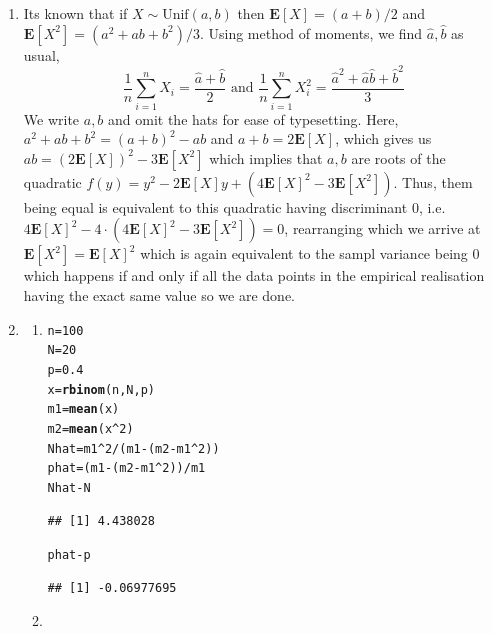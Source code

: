 \documentclass[12pt,a4paper]{article}\usepackage[]{graphicx}\usepackage[]{xcolor}
\makeatletter
\newcommand{\hlnum}[1]{\textcolor[rgb]{0.686,0.059,0.569}{#1}}%
\newcommand{\hlopt}[1]{\textcolor[rgb]{0,0,0}{#1}}%
\newcommand{\hldef}[1]{\textcolor[rgb]{0.345,0.345,0.345}{#1}}%
\newcommand{\hlkwb}[1]{\textcolor[rgb]{0.69,0.353,0.396}{#1}}%
\newcommand{\hlkwd}[1]{\textcolor[rgb]{0.737,0.353,0.396}{\textbf{#1}}}%
\newenvironment{kframe}{%
 \def\at@end@of@kframe{}%
 \ifinner\ifhmode%
  \def\at@end@of@kframe{\end{minipage}}%
  \begin{minipage}{\columnwidth}%
 \fi\fi%
 \def\FrameCommand##1{\hskip\@totalleftmargin \hskip-\fboxsep
 \colorbox{shadecolor}{##1}\hskip-\fboxsep
     \hskip-\linewidth \hskip-\@totalleftmargin \hskip\columnwidth}%
 \MakeFramed {\advance\hsize-\width
   \@totalleftmargin\z@ \linewidth\hsize
   \@setminipage}}%
 {\par\unskip\endMakeFramed%
 \at@end@of@kframe}
\newenvironment{knitrout}{}{} %
\makeatother
\begin{document}
\begin{enumerate}[label=\arabic*.]
	\item 
	Its known that if $X\sim\text{Unif}(a,b)$ then $\mathbf{E}[X]=(a+b)/2$
	and $\mathbf{E}[X^2]=(a^2+ab+b^2)/3$. Using method of moments, we find
	$\hat{a},\hat{b}$ as usual,
	$$\frac{1}{n}\sum_{i=1}^nX_i=\frac{\hat{a}+\hat{b}}{2}\text{ and
	}\frac{1}{n}\sum_{i=1}^nX_i^2=\frac{\hat{a}^2+\hat{a}\hat{b}+\hat{b}^2}{3}$$
	We write $a,b$ and omit the hats for ease of typesetting. Here,
	$a^2+ab+b^2=(a+b)^2-ab$ and $a+b=2\mathbf{E}[X]$, which gives us
	$ab=(2\mathbf{E}[X])^2-3\mathbf{E}[X^2]$ which implies that $a,b$ are
	roots of the quadratic
	$f(y)=y^2-2\mathbf{E}[X]y+(4\mathbf{E}[X]^2-3\mathbf{E}[X^2])$. Thus,
	them being equal is equivalent to this quadratic having discriminant
	$0$, i.e.
	$4\mathbf{E}[X]^2-4\cdot(4\mathbf{E}[X]^2-3\mathbf{E}[X^2])=0$,
	rearranging which we arrive at $\mathbf{E}[X^2]=\mathbf{E}[X]^2$ which
	is again equivalent to the sampl variance being $0$ which happens if
	and only if all the data points in the empirical realisation having the
	exact same value so we are done.
	\item 
	\begin{enumerate}[label=(\alph*)]
        \item 
\begin{knitrout}
\color{fgcolor}\begin{kframe}
\begin{alltt}
\hldef{n} \hlkwb{=} \hlnum{100}
\hldef{N} \hlkwb{=} \hlnum{20}
\hldef{p} \hlkwb{=} \hlnum{0.4}
\hldef{x} \hlkwb{=} \hlkwd{rbinom}\hldef{(n,N,p)}
\hldef{m1} \hlkwb{=} \hlkwd{mean}\hldef{(x)}
\hldef{m2} \hlkwb{=} \hlkwd{mean}\hldef{(x}\hlopt{^}\hlnum{2}\hldef{)}
\hldef{Nhat} \hlkwb{=} \hldef{m1}\hlopt{^}\hlnum{2} \hlopt{/} \hldef{(m1} \hlopt{-} \hldef{(m2} \hlopt{-} \hldef{m1}\hlopt{^}\hlnum{2}\hldef{))}
\hldef{phat} \hlkwb{=} \hldef{(m1} \hlopt{-} \hldef{(m2} \hlopt{-} \hldef{m1}\hlopt{^}\hlnum{2}\hldef{))} \hlopt{/} \hldef{m1}
\hldef{Nhat} \hlopt{-} \hldef{N}
\end{alltt}
\begin{verbatim}
## [1] 4.438028
\end{verbatim}
\begin{alltt}
\hldef{phat} \hlopt{-} \hldef{p}
\end{alltt}
\begin{verbatim}
## [1] -0.06977695
\end{verbatim}
\end{kframe}
\end{knitrout}
        \item 

\end{enumerate}
\end{enumerate}
\end{document}
